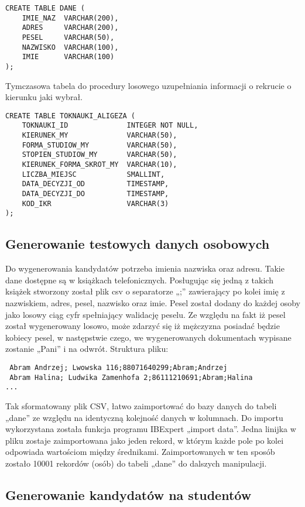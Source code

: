 \begin{lstlisting}
CREATE TABLE DANE (
    IMIE_NAZ  VARCHAR(200),
    ADRES     VARCHAR(200),
    PESEL     VARCHAR(50),
    NAZWISKO  VARCHAR(100),
    IMIE      VARCHAR(100)
);
\end{lstlisting}
Tymczasowa tabela do procedury losowego uzupełniania informacji o rekrucie o kierunku jaki wybrał.
\begin{lstlisting}
CREATE TABLE TOKNAUKI_ALIGEZA (
    TOKNAUKI_ID              INTEGER NOT NULL,
    KIERUNEK_MY              VARCHAR(50),
    FORMA_STUDIOW_MY         VARCHAR(50),
    STOPIEN_STUDIOW_MY       VARCHAR(50),
    KIERUNEK_FORMA_SKROT_MY  VARCHAR(10),
    LICZBA_MIEJSC            SMALLINT,
    DATA_DECYZJI_OD          TIMESTAMP,
    DATA_DECYZJI_DO          TIMESTAMP,
    KOD_IKR                  VARCHAR(3)
);
\end{lstlisting}
\subsection{ Generowanie testowych danych osobowych}

Do wygenerowania kandydatów potrzeba imienia nazwiska oraz adresu. Takie dane dostępne są w książkach telefonicznych. Posługując się jedną z takich książek stworzony został plik csv o separatorze „;” zawierający po kolei imię z nazwiskiem, adres, pesel, nazwisko oraz imie. Pesel został dodany do każdej osoby jako losowy ciąg cyfr spełniający walidację peselu. Ze względu na fakt iż pesel został wygenerowany losowo, może zdarzyć się iż mężczyzna posiadać będzie kobiecy pesel, w następstwie czego, we wygenerowanych dokumentach wypisane zostanie „Pani” i na odwrót.
Struktura pliku:
\begin{lstlisting}
 Abram Andrzej; Lwowska 116;88071640299;Abram;Andrzej
 Abram Halina; Ludwika Zamenhofa 2;86111210691;Abram;Halina
...

\end{lstlisting}

Tak sformatowany plik CSV,  łatwo zaimportować do bazy danych do tabeli „dane” ze względu na identyczną kolejność danych w kolumnach. Do importu wykorzystana została funkcja programu IBExpert „import data”. Jedna linijka w pliku zostaje zaimportowana jako jeden rekord, w którym każde pole po kolei odpowiada wartościom między średnikami. Zaimportowanych w ten sposób zostało 10001 rekordów (osób) do tabeli „dane” do dalszych manipulacji.

\subsection{Generowanie kandydatów na studentów}


